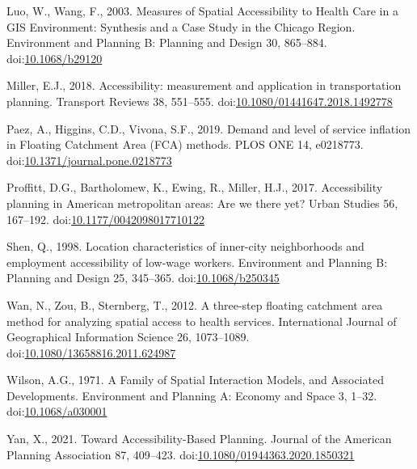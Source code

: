 \documentclass[]{elsarticle} %
\newlength{\cslhangindent}
\newlength{\cslentryspacingunit} %
\newenvironment{CSLReferences}[2] %
 {%
  \setlength{\parindent}{0pt}
  \ifodd #1
  \let\oldpar\par
  \def\par{\hangindent=\cslhangindent\oldpar}
  \fi
  \setlength{\parskip}{#2\cslentryspacingunit}
 }%
 {}
\begin{document}
\begin{CSLReferences}{1}{0}
\leavevmode{}%
Luo, W., Wang, F., 2003. Measures of Spatial Accessibility to Health
Care in a GIS Environment: Synthesis and a Case Study in the Chicago
Region. Environment and Planning B: Planning and Design 30, 865--884.
doi:\href{https://doi.org/10.1068/b29120}{10.1068/b29120}

\leavevmode{}%
Miller, E.J., 2018. Accessibility: measurement and application in
transportation planning. Transport Reviews 38, 551--555.
doi:\href{https://doi.org/10.1080/01441647.2018.1492778}{10.1080/01441647.2018.1492778}

\leavevmode{}%
Paez, A., Higgins, C.D., Vivona, S.F., 2019. Demand and level of service
inflation in Floating Catchment Area (FCA) methods. PLOS ONE 14,
e0218773.
doi:\href{https://doi.org/10.1371/journal.pone.0218773}{10.1371/journal.pone.0218773}

\leavevmode{}%
Proffitt, D.G., Bartholomew, K., Ewing, R., Miller, H.J., 2017.
Accessibility planning in American metropolitan areas: Are we there yet?
Urban Studies 56, 167--192.
doi:\href{https://doi.org/10.1177/0042098017710122}{10.1177/0042098017710122}

\leavevmode{}%
Shen, Q., 1998. Location characteristics of inner-city neighborhoods and
employment accessibility of low-wage workers. Environment and Planning
B: Planning and Design 25, 345--365.
doi:\href{https://doi.org/10.1068/b250345}{10.1068/b250345}

\leavevmode{}%
Wan, N., Zou, B., Sternberg, T., 2012. A three-step floating catchment
area method for analyzing spatial access to health services.
International Journal of Geographical Information Science 26,
1073--1089.
doi:\href{https://doi.org/10.1080/13658816.2011.624987}{10.1080/13658816.2011.624987}

\leavevmode{}%
Wilson, A.G., 1971. A Family of Spatial Interaction Models, and
Associated Developments. Environment and Planning A: Economy and Space
3, 1--32. doi:\href{https://doi.org/10.1068/a030001}{10.1068/a030001}

\leavevmode{}%
Yan, X., 2021. Toward Accessibility-Based Planning. Journal of the
American Planning Association 87, 409--423.
doi:\href{https://doi.org/10.1080/01944363.2020.1850321}{10.1080/01944363.2020.1850321}

\end{CSLReferences}
\end{document}
